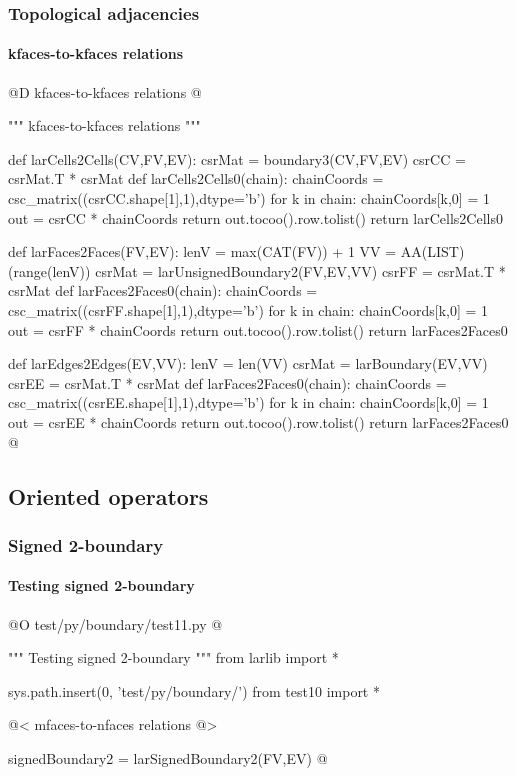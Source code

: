 \documentclass[11pt,oneside]{article}    %
\begin{document}
\subsubsection{Topological adjacencies}

\paragraph{kfaces-to-kfaces relations}
@D kfaces-to-kfaces relations
@{""" kfaces-to-kfaces relations """

def larCells2Cells(CV,FV,EV):
    csrMat = boundary3(CV,FV,EV)
    csrCC = csrMat.T * csrMat
    def larCells2Cells0(chain):
        chainCoords = csc_matrix((csrCC.shape[1],1),dtype='b')
        for k in chain: chainCoords[k,0] = 1
        out = csrCC * chainCoords
        return out.tocoo().row.tolist()
    return larCells2Cells0

def larFaces2Faces(FV,EV):
    lenV = max(CAT(FV)) + 1
    VV = AA(LIST)(range(lenV))
    csrMat = larUnsignedBoundary2(FV,EV,VV)
    csrFF = csrMat.T * csrMat
    def larFaces2Faces0(chain):
        chainCoords = csc_matrix((csrFF.shape[1],1),dtype='b')
        for k in chain: chainCoords[k,0] = 1
        out = csrFF * chainCoords
        return out.tocoo().row.tolist()
    return larFaces2Faces0

def larEdges2Edges(EV,VV):
    lenV = len(VV)
    csrMat = larBoundary(EV,VV)
    csrEE = csrMat.T * csrMat
    def larFaces2Faces0(chain):
        chainCoords = csc_matrix((csrEE.shape[1],1),dtype='b')
        for k in chain: chainCoords[k,0] = 1
        out = csrEE * chainCoords
        return out.tocoo().row.tolist()
    return larFaces2Faces0
@}



\subsection{Oriented operators}

\subsubsection{Signed 2-boundary}



\paragraph{Testing signed 2-boundary}
@O test/py/boundary/test11.py
@{""" Testing signed 2-boundary """
from larlib import *

sys.path.insert(0, 'test/py/boundary/')
from test10 import *

@< mfaces-to-nfaces relations @>

signedBoundary2 = larSignedBoundary2(FV,EV)
@}
\end{document}

